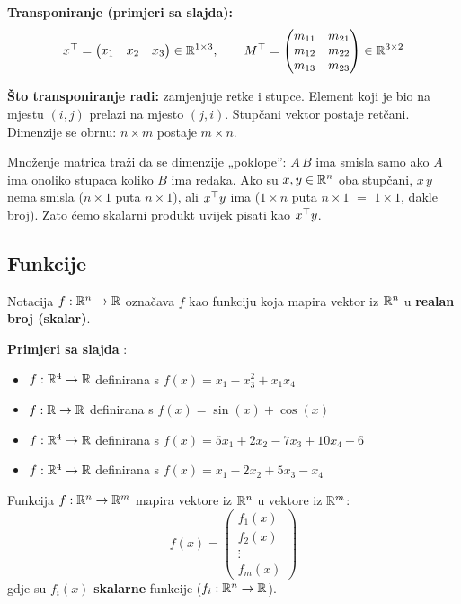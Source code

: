 \textbf{Transponiranje (primjeri sa slajda):}
\[
x^{\top} = \begin{pmatrix} x_1 & x_2 & x_3 \end{pmatrix} \in \mathbb{R}^{1\times 3},
\qquad
M^{\top} = \begin{pmatrix} m_{11} & m_{21} \\ m_{12} & m_{22} \\
                      m_{13} & m_{23} \end{pmatrix} \in \mathbb{R}^{3\times 2}
\]

\textbf{Što transponiranje radi:} zamjenjuje retke i stupce. Element koji je
bio na mjestu $(i,j)$ prelazi na mjesto $(j,i)$. Stupčani vektor postaje
retčani. Dimenzije se obrnu: $n \times m$ postaje $m \times n$.

\begin{napomena}
Množenje matrica traži da se dimenzije „poklope”: $A\,B$ ima smisla samo ako
$A$ ima onoliko stupaca koliko $B$ ima redaka. Ako su $x, y \in \mathbb{R}^n$ oba
stupčani, $x\,y$ nema smisla ($n\times 1$ puta $n \times 1$), ali $x^{\top} y$ ima
($1 \times n$ puta $n \times 1$ $=$ $1\times 1$, dakle broj). Zato ćemo
skalarni produkt uvijek pisati kao $x^{\top} y$.
\end{napomena}

\subsection{Funkcije}

\begin{definicija}
Notacija $f : \mathbb{R}^n \to \mathbb{R}$ označava $f$ kao funkciju koja mapira vektor iz
$\mathbb{R}^n$ u \textbf{realan broj (skalar)}.
\end{definicija}

\textbf{Primjeri sa slajda} :
\begin{itemize}
  \item $f : \mathbb{R}^4 \to \mathbb{R}$ definirana s $f(x) = x_1 - x_3^2 + x_1x_4$
  \item $f : \mathbb{R} \to \mathbb{R}$ definirana s $f(x) = \sin(x) + \cos(x)$
  \item $f : \mathbb{R}^4 \to \mathbb{R}$ definirana s $f(x) = 5x_1 + 2x_2 - 7x_3 + 10x_4 + 6$
  \item $f : \mathbb{R}^4 \to \mathbb{R}$ definirana s $f(x) = x_1 - 2x_2 + 5x_3 - x_4$
\end{itemize}

\begin{definicija}
Funkcija $f : \mathbb{R}^n \to \mathbb{R}^m$ mapira vektore iz $\mathbb{R}^n$ u vektore iz $\mathbb{R}^m$:
\[
f(x) = \begin{pmatrix} f_1(x) \\ f_2(x) \\ \vdots \\ f_m(x) \end{pmatrix}
\]
gdje su $f_i(x)$ \textbf{skalarne} funkcije ($f_i : \mathbb{R}^n \to \mathbb{R}$).
\end{definicija}

